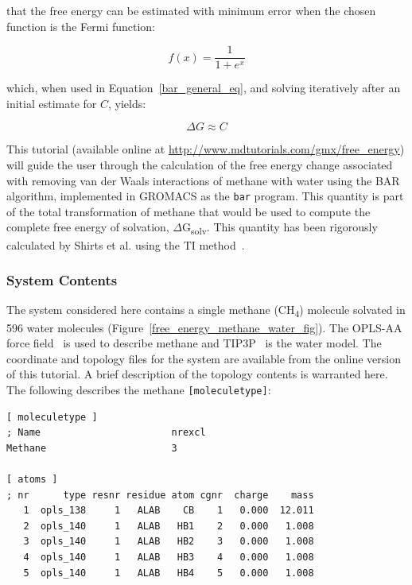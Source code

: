 \documentclass[9pt,tutorial]{livecoms}
\newcommand{\urlstring}{http://www.mdtutorials.com/gmx}
\newcommand{\tutorialfes}{\url{\urlstring/free_energy}}
\begin{document}
that the free energy can be estimated with minimum error when the chosen function is the Fermi function:

\begin{equation} \label{bar_fermi_eq}
f(x) = \frac{1}{1 + e^x}
\end{equation}

which, when used in Equation~\ref{bar_general_eq}, and solving iteratively after an initial estimate for $C$, yields:

\begin{equation} \label{bar_final_eq}
\Delta G \approx C
\end{equation}

This tutorial (available online at \tutorialfes) will guide the user through the calculation of the free energy change associated with removing van der Waals interactions of methane with water using the BAR algorithm, implemented in GROMACS as the \texttt{bar} program. This quantity is part of the total transformation of methane that would be used to compute the complete free energy of solvation, $\Delta$G\textsubscript{solv}. This quantity has been rigorously calculated by Shirts et al. using the TI method~\cite{Shirts2003}.

\subsubsection{System Contents} \label{fes_top}

The system considered here contains a single methane (CH\textsubscript4) molecule solvated in 596 water molecules (Figure~\ref{free_energy_methane_water_fig}). The OPLS-AA force field~\cite{Kaminski2001} is used to describe methane and TIP3P~\cite{Jorgensen1984} is the water model. The coordinate and topology files for the system are available from the online version of this tutorial. A brief description of the topology contents is warranted here. The following describes the methane \texttt{[moleculetype]}:

\begin{verbatim}
[ moleculetype ]
; Name                       nrexcl
Methane                      3

[ atoms ]
; nr      type resnr residue atom cgnr  charge    mass
   1  opls_138     1   ALAB    CB    1   0.000  12.011   
   2  opls_140     1   ALAB   HB1    2   0.000   1.008   
   3  opls_140     1   ALAB   HB2    3   0.000   1.008   
   4  opls_140     1   ALAB   HB3    4   0.000   1.008   
   5  opls_140     1   ALAB   HB4    5   0.000   1.008
\end{verbatim}
\end{document}
